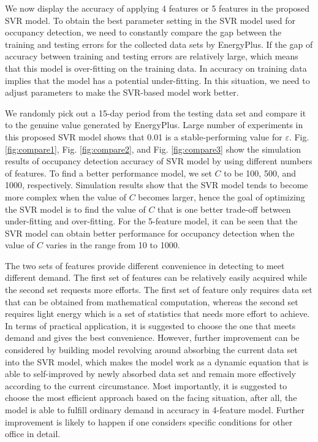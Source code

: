 We now display the accuracy of applying 4 features or 5 features in the
proposed SVR model. To obtain the best parameter setting in the SVR model used
for occupancy detection, we need to constantly compare the gap between the
training and testing errors for the collected data sets by EnergyPlus. If the
gap of accuracy between training and testing errors are relatively large, which
means that this model is over-fitting on the training data. In accuracy on
training data implies that the model has a potential under-fitting. In this
situation, we need to adjust parameters to make the SVR-based model work
better.

We randomly pick out a 15-day period from the testing data set and compare it
to the genuine value generated by EnergyPlus. Large number of experiments in
this proposed SVR model shows that 0.01 is a stable-performing value for
$\varepsilon$. Fig. \ref{fig:compare1}, Fig. \ref{fig:compare2}, and Fig.
\ref{fig:compare3} show the simulation results of occupancy detection accuracy
of SVR model by using different numbers of features. To find a better
performance model, we set $C$ to be 100, 500, and 1000, respectively.
Simulation results show that the SVR model tends to become more complex when
the value of $C$ becomes larger, hence the goal of optimizing the SVR model is
to find the value of $C$ that is one better trade-off between under-fitting and
over-fitting. For the 5-feature model, it can be seen that the SVR model can
obtain better performance for occupancy detection when the value of $C$ varies
in the range from 10 to 1000.

The two sets of features provide different convenience in detecting to meet
different demand. The first set of features  can be relatively easily acquired
while the second set requests more efforts. The first set of feature only
requires data set that can be obtained from mathematical computation, whereas the
second set  requires light energy which is a set of statistics that needs more
effort to achieve. In terms of practical application, it is suggested to choose
the one that meets demand and gives the best convenience. However, further
improvement can be considered by building model revolving around absorbing the
current data set into the SVR model, which makes the model work as a dynamic
equation that is able to self-improved by newly absorbed data set and remain
more effectively according to the current circumstance. Most importantly, it is
suggested to choose the most efficient approach based on the facing situation,
after all, the model is able to fulfill ordinary demand in accuracy in
4-feature model. Further improvement is likely to happen if one considers
specific conditions for other office in detail.

